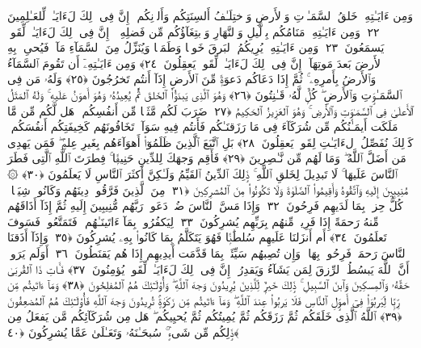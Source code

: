  وَمِن ءَايَـٰتِهِۦ خَلقُ ٱلسَّمَـٰوَٟتِ وَٱلأَرضِ وَٱختِلَـٰفُ أَلسِنَتِكُم وَأَلوَٟنِكُم ۚ إِنَّ فِى ذَٟلِكَ لَءَايَـٰتٍۢ لِّلعَـٰلِمِينَ ﴿٢٢﴾
 وَمِن ءَايَـٰتِهِۦ مَنَامُكُم بِٱلَّيلِ وَٱلنَّهَارِ وَٱبتِغَآؤُكُم مِّن فَضلِهِۦٓ ۚ إِنَّ فِى ذَٟلِكَ لَءَايَـٰتٍۢ لِّقَومٍۢ يَسمَعُونَ ﴿٢٣﴾
 وَمِن ءَايَـٰتِهِۦ يُرِيكُمُ ٱلبَرقَ خَوفًۭا وَطَمَعًۭا وَيُنَزِّلُ مِنَ ٱلسَّمَآءِ مَآءًۭ فَيُحىِۦ بِهِ ٱلأَرضَ بَعدَ مَوتِهَآ ۚ إِنَّ فِى ذَٟلِكَ لَءَايَـٰتٍۢ لِّقَومٍۢ يَعقِلُونَ ﴿٢٤﴾
 وَمِن ءَايَـٰتِهِۦٓ أَن تَقُومَ ٱلسَّمَآءُ وَٱلأَرضُ بِأَمرِهِۦ ۚ ثُمَّ إِذَا دَعَاكُم دَعوَةًۭ مِّنَ ٱلأَرضِ إِذَآ أَنتُم تَخرُجُونَ ﴿٢٥﴾
 وَلَهُۥ مَن فِى ٱلسَّمَـٰوَٟتِ وَٱلأَرضِ ۖ كُلٌّۭ لَّهُۥ قَـٰنِتُونَ ﴿٢٦﴾
 وَهُوَ ٱلَّذِى يَبدَؤُا۟ ٱلخَلقَ ثُمَّ يُعِيدُهُۥ وَهُوَ أَهوَنُ عَلَيهِ ۚ وَلَهُ ٱلمَثَلُ ٱلأَعلَىٰ فِى ٱلسَّمَـٰوَٟتِ وَٱلأَرضِ ۚ وَهُوَ ٱلعَزِيزُ ٱلحَكِيمُ ﴿٢٧﴾
 ضَرَبَ لَكُم مَّثَلًۭا مِّن أَنفُسِكُم ۖ هَل لَّكُم مِّن مَّا مَلَكَت أَيمَـٰنُكُم مِّن شُرَكَآءَ فِى مَا رَزَقنَـٰكُم فَأَنتُم فِيهِ سَوَآءٌۭ تَخَافُونَهُم كَخِيفَتِكُم أَنفُسَكُم ۚ كَذَٟلِكَ نُفَصِّلُ ٱلءَايَـٰتِ لِقَومٍۢ يَعقِلُونَ ﴿٢٨﴾
 بَلِ ٱتَّبَعَ ٱلَّذِينَ ظَلَمُوٓا۟ أَهوَآءَهُم بِغَيرِ عِلمٍۢ ۖ فَمَن يَهدِى مَن أَضَلَّ ٱللَّهُ ۖ وَمَا لَهُم مِّن نَّـٰصِرِينَ ﴿٢٩﴾
 فَأَقِم وَجهَكَ لِلدِّينِ حَنِيفًۭا ۚ فِطرَتَ ٱللَّهِ ٱلَّتِى فَطَرَ ٱلنَّاسَ عَلَيهَا ۚ لَا تَبدِيلَ لِخَلقِ ٱللَّهِ ۚ ذَٟلِكَ ٱلدِّينُ ٱلقَيِّمُ وَلَـٰكِنَّ أَكثَرَ ٱلنَّاسِ لَا يَعلَمُونَ ﴿٣٠﴾
 ۞ مُنِيبِينَ إِلَيهِ وَٱتَّقُوهُ وَأَقِيمُوا۟ ٱلصَّلَوٰةَ وَلَا تَكُونُوا۟ مِنَ ٱلمُشرِكِينَ ﴿٣١﴾
 مِنَ ٱلَّذِينَ فَرَّقُوا۟ دِينَهُم وَكَانُوا۟ شِيَعًۭا ۖ كُلُّ حِزبٍۭ بِمَا لَدَيهِم فَرِحُونَ ﴿٣٢﴾
 وَإِذَا مَسَّ ٱلنَّاسَ ضُرٌّۭ دَعَوا۟ رَبَّهُم مُّنِيبِينَ إِلَيهِ ثُمَّ إِذَآ أَذَاقَهُم مِّنهُ رَحمَةً إِذَا فَرِيقٌۭ مِّنهُم بِرَبِّهِم يُشرِكُونَ ﴿٣٣﴾
 لِيَكفُرُوا۟ بِمَآ ءَاتَينَـٰهُم ۚ فَتَمَتَّعُوا۟ فَسَوفَ تَعلَمُونَ ﴿٣٤﴾
 أَم أَنزَلنَا عَلَيهِم سُلطَٰنًۭا فَهُوَ يَتَكَلَّمُ بِمَا كَانُوا۟ بِهِۦ يُشرِكُونَ ﴿٣٥﴾
 وَإِذَآ أَذَقنَا ٱلنَّاسَ رَحمَةًۭ فَرِحُوا۟ بِهَا ۖ وَإِن تُصِبهُم سَيِّئَةٌۢ بِمَا قَدَّمَت أَيدِيهِم إِذَا هُم يَقنَطُونَ ﴿٣٦﴾
 أَوَلَم يَرَوا۟ أَنَّ ٱللَّهَ يَبسُطُ ٱلرِّزقَ لِمَن يَشَآءُ وَيَقدِرُ ۚ إِنَّ فِى ذَٟلِكَ لَءَايَـٰتٍۢ لِّقَومٍۢ يُؤمِنُونَ ﴿٣٧﴾
 فَـَٔاتِ ذَا ٱلقُربَىٰ حَقَّهُۥ وَٱلمِسكِينَ وَٱبنَ ٱلسَّبِيلِ ۚ ذَٟلِكَ خَيرٌۭ لِّلَّذِينَ يُرِيدُونَ وَجهَ ٱللَّهِ ۖ وَأُو۟لَـٰٓئِكَ هُمُ ٱلمُفلِحُونَ ﴿٣٨﴾
 وَمَآ ءَاتَيتُم مِّن رِّبًۭا لِّيَربُوَا۟ فِىٓ أَموَٟلِ ٱلنَّاسِ فَلَا يَربُوا۟ عِندَ ٱللَّهِ ۖ وَمَآ ءَاتَيتُم مِّن زَكَوٰةٍۢ تُرِيدُونَ وَجهَ ٱللَّهِ فَأُو۟لَـٰٓئِكَ هُمُ ٱلمُضعِفُونَ ﴿٣٩﴾
 ٱللَّهُ ٱلَّذِى خَلَقَكُم ثُمَّ رَزَقَكُم ثُمَّ يُمِيتُكُم ثُمَّ يُحيِيكُم ۖ هَل مِن شُرَكَآئِكُم مَّن يَفعَلُ مِن ذَٟلِكُم مِّن شَىءٍۢ ۚ سُبحَـٰنَهُۥ وَتَعَـٰلَىٰ عَمَّا يُشرِكُونَ ﴿٤٠﴾
